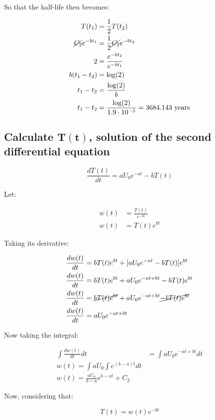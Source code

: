   So that the half-life then becomes:

  \begin{align*}
    T(t_1) &= \frac{1}{2}T(t_2)\\
    \cancel{C_2}e^{-bt_1} &= \frac{1}{2}\cancel{C_2}e^{-bt_2}\\
    2 &= \frac{e^{-bt_2}}{e^{-bt_1}}\\
    b(t_1-t_2) &= \log(2)\\
    t_1-t_2 &= \frac{\log(2)}{b}\\
    t_1-t_2 &= \frac{\log(2)}{1.9 \cdot 10^{-5}} = 3684.143\text{ years}\\
  \end{align*}



  \subsection{Calculate $\mathbf{T(t)}$, solution of the second differential equation}

  $$\frac{dT(t)}{dt} = aU_0e^{-at} - bT(t)$$

  Let:

  \begin{align*}
    w(t) &= \frac{T(t)}{e^{-bt}}\\
    w(t) &= T(t)e^{bt}
  \end{align*}

  Taking its derivative:

  \begin{align*}
    \frac{dw(t)}{dt} &= bT(t)e^{bt} + [aU_0e^{-at} - bT(t)]e^{bt}\\
    \frac{dw(t)}{dt} &= bT(t)e^{bt} + aU_0e^{-at + bt} - bT(t)e^{bt}\\
    \frac{dw(t)}{dt} &= \cancel{bT(t)e^{bt}} + aU_0e^{-at + bt} \cancel{- bT(t)e^{bt}}\\
    \frac{dw(t)}{dt} &= aU_0e^{-at + bt}
  \end{align*}

  Now taking the integral:

  \begin{align*}
    \int\frac{dw(t)}{dt}dt &= \int aU_0 e^{-at + bt}dt\\
    w(t) = \int aU_0\int e^{(b-a)t}dt\\
    w(t) = \frac{aU_0}{b-a}e^{b-at} + C_2
  \end{align*}

  Now, considering that:

  $$T(t) = w(t)e^{-bt}$$

